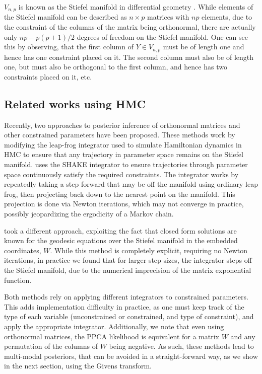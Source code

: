 \documentclass{article}
\begin{document}
$V_{n,p}$ is known as the Stiefel manifold in differential geometry \citep{muirhead2009aspects}. While elements of the Stiefel manifold can be described as $n \times p$ matrices with $np$ elements, due to the constraint of the columns of the matrix being orthonormal, there are actually only $np-p(p+1)/2$ degrees of freedom on the Stiefel manifold. One can see this by observing, that the first column of $Y \in V_{n,p}$ must be of length one and hence has one constraint placed on it. The second column must also be of length one, but must also be orthogonal to the first column, and hence has two constraints placed on it, etc.

\subsection{Related works using HMC}
Recently, two approaches to posterior inference of orthonormal matrices and other constrained parameters have been proposed. These methods work by modifying the leap-frog integrator used to simulate Hamiltonian dynamics in HMC to ensure that any trajectory in parameter space remains on the Stiefel manifold. \citet{brubaker2012family} uses the SHAKE integrator \citep{leimkuhler2004simulating} to ensure trajectories through parameter space continuously satisfy the required constraints. The integrator works by repeatedly taking a step forward that may be off the manifold using ordinary leap frog, then projecting back down to the nearest point on the manifold. This projection is done via Newton iterations, which may not converge in practice, possibly jeopardizing the ergodicity of a Markov chain.

\citet{byrne2013geodesic} took a different approach, exploiting the fact that closed form solutions are known for the geodesic equations over the Stiefel manifold in the embedded coordinates, $W$. While this method is completely explicit, requiring no Newton iterations, in practice we found that for larger step sizes, the integrator steps off the Stiefel manifold, due to the numerical imprecision of the matrix exponential function.

Both methods rely on applying different integrators to constrained parameters. This adds implementation difficulty in practice, as one must keep track of the type of each variable (unconstrained or constrained, and type of constraint), and apply the appropriate integrator. Additionally, we note that even using orthonormal matrices, the PPCA likelihood is equivalent for a matrix $W$ and any permutation of the columns of $W$ being negative. As such, these methods lead to multi-modal posteriors, that can be avoided in a straight-forward way, as we show in the next section, using the Givens transform.
\end{document}
